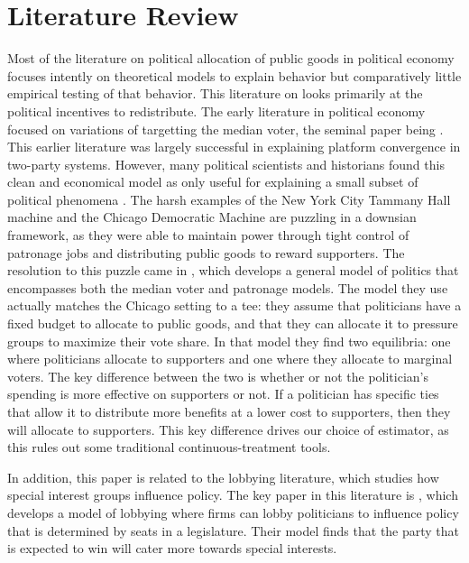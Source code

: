 \section{Literature Review}\label{sec:lit_review}

Most of the literature on political allocation of public goods in political economy focuses intently on theoretical models to explain behavior but comparatively little empirical testing of that behavior. 
This literature on looks primarily at the political incentives to redistribute.
The early literature in political economy focused on variations of targetting the median voter, the seminal paper being \cite{downs1957economic}.
This earlier literature was largely successful in explaining platform convergence in two-party systems.
However, many political scientists and historians found this clean and economical model as only useful for explaining a small subset of political phenomena \cite{rakove1975don} \cite{golway2014machine}.
The harsh examples of the New York City Tammany Hall machine and the Chicago Democratic Machine are puzzling in a downsian framework, as they were able to maintain power through tight control of patronage jobs and distributing public goods to reward supporters.
The resolution to this puzzle came in \cite{dixit_londregan1996}, which develops a general model of politics that encompasses both the median voter and patronage models.
The model they use actually matches the Chicago setting to a tee: they assume that politicians have a fixed budget to allocate to public goods, and that they can allocate it to pressure groups to maximize their vote share.
In that model they find two equilibria: one where politicians allocate to supporters and one where they allocate to marginal voters.
The key difference between the two is whether or not the politician's spending is more effective on supporters or not. 
If a politician has specific ties that allow it to distribute more benefits at a lower cost to supporters, then they will allocate to supporters.
This key difference drives our choice of estimator, as this rules out some traditional continuous-treatment tools. 

In addition, this paper is related to the lobbying literature, which studies how special interest groups influence policy. 
The key paper in this literature is \cite{grossman_helpman_1994}, which develops a model of lobbying where firms can lobby politicians to influence policy that is determined by seats in a legislature. 
Their model finds that the party that is expected to win will cater more towards special interests.

